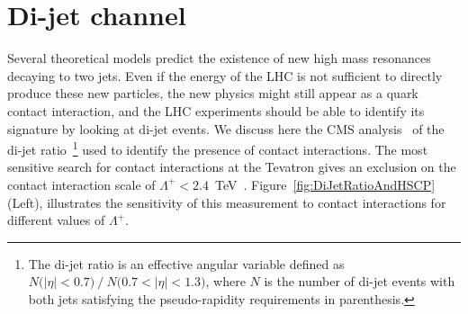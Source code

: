 \documentclass{PoS}
\begin{document}
\section{Di-jet channel} \label{dijet}
Several theoretical models predict the existence of new 
high mass resonances decaying to two jets.
Even if the energy of the LHC is not sufficient to directly produce 
these new particles, the new physics might still appear as 
a quark contact interaction,
and the LHC experiments should be able to identify its signature 
by looking at di-jet events.
We discuss here the CMS analysis~\cite{DIJETSNOTE}
of the di-jet ratio~\footnote{
The di-jet ratio is an effective angular variable
defined as $N\mbox{(}|\eta|<0.7\mbox{)}~/~N\mbox{(}0.7<|\eta|< 1.3 \mbox{)}$, 
where $N$ is the number of di-jet events with both jets satisfying the 
pseudo-rapidity requirements in parenthesis.} 
used to identify the presence of contact interactions. 
The most sensitive search for contact interactions at the Tevatron 
gives an exclusion on the contact interaction scale 
of $\Lambda^{+} < 2.4$~TeV~\cite{Abbott:1998wh}.  
Figure~\ref{fig:DiJetRatioAndHSCP} (Left), illustrates the sensitivity of this measurement to 
contact interactions for different values of $\Lambda^{+}$.
\end{document}
